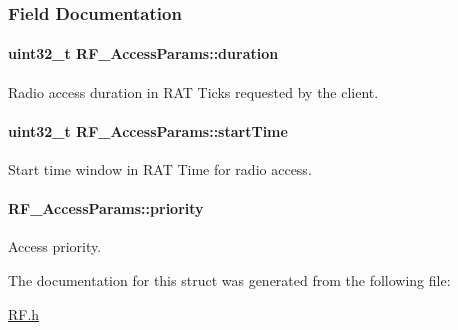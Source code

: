 \subsubsection{Field Documentation}
\paragraph[{duration}]{\setlength{\rightskip}{0pt plus 5cm}uint32\+\_\+t R\+F\+\_\+\+Access\+Params\+::duration}\label{struct_r_f___access_params_a0d6adb1c309962431a8b777a44325ade}


Radio access duration in R\+A\+T Ticks requested by the client. 

\paragraph[{start\+Time}]{\setlength{\rightskip}{0pt plus 5cm}uint32\+\_\+t R\+F\+\_\+\+Access\+Params\+::start\+Time}\label{struct_r_f___access_params_a4ec6ddde388c80d5e2d4b3d8311fcaaf}


Start time window in R\+A\+T Time for radio access. 

\paragraph[{priority}]{ R\+F\+\_\+\+Access\+Params\+::priority}\label{struct_r_f___access_params_a9ed4a1af207a7f63beb8cfebdd940894}


Access priority. 



The documentation for this struct was generated from the following file\+:\begin{DoxyCompactItemize}
\item 
\hyperlink{_r_f_8h}{R\+F.\+h}\end{DoxyCompactItemize}
